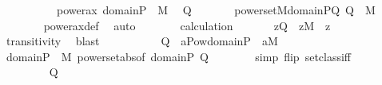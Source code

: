 \begin{isabellebody}
\ \ \isamarkupfalse%
\ {\isacharminus}{\kern0pt}\isanewline
\ \ \ \ \isamarkupfalse%
\ power{\isacharunderscore}{\kern0pt}ax\ {\isacartoucheopen}domain{\isacharparenleft}{\kern0pt}{\isasymtau}{\isacharparenright}{\kern0pt}{\isasymtimes}P\ {\isasymin}\ M{\isacartoucheclose}\ \isamarkupfalse%
\ Q\ \isanewline
\ \ \ \ \ \ {\isachardoublequoteopen}powerset{\isacharparenleft}{\kern0pt}{\isacharhash}{\kern0pt}{\isacharhash}{\kern0pt}M{\isacharcomma}{\kern0pt}domain{\isacharparenleft}{\kern0pt}{\isasymtau}{\isacharparenright}{\kern0pt}{\isasymtimes}P{\isacharcomma}{\kern0pt}Q{\isacharparenright}{\kern0pt}{\isachardoublequoteclose}\ {\isachardoublequoteopen}Q\ {\isasymin}\ M{\isachardoublequoteclose}\isanewline
\ \ \ \ \ \ \isamarkupfalse%
\ power{\isacharunderscore}{\kern0pt}ax{\isacharunderscore}{\kern0pt}def\ \isamarkupfalse%
\ auto\isanewline
\ \ \ \ \isamarkupfalse%
\ \isamarkupfalse%
\ calculation\ \isanewline
\ \ \ \ \isamarkupfalse%
\ {\isachardoublequoteopen}z{\isasymin}Q\ {\isasymLongrightarrow}\ z{\isasymin}M{\isachardoublequoteclose}\ \ z\isanewline
\ \ \ \ \ \ \isamarkupfalse%
\ transitivity\ \isamarkupfalse%
\ blast\isanewline
\ \ \ \ \isamarkupfalse%
\isanewline
\ \ \ \ \isamarkupfalse%
\ {\isachardoublequoteopen}Q\ {\isacharequal}{\kern0pt}\ {\isacharbraceleft}{\kern0pt}a{\isasymin}Pow{\isacharparenleft}{\kern0pt}domain{\isacharparenleft}{\kern0pt}{\isasymtau}{\isacharparenright}{\kern0pt}{\isasymtimes}P{\isacharparenright}{\kern0pt}\ {\isachardot}{\kern0pt}\ a{\isasymin}M{\isacharbraceright}{\kern0pt}{\isachardoublequoteclose}\isanewline
\ \ \ \ \ \ \isamarkupfalse%
\ {\isacartoucheopen}domain{\isacharparenleft}{\kern0pt}{\isasymtau}{\isacharparenright}{\kern0pt}{\isasymtimes}P\ {\isasymin}\ M{\isacartoucheclose}\ powerset{\isacharunderscore}{\kern0pt}abs{\isacharbrackleft}{\kern0pt}of\ {\isachardoublequoteopen}domain{\isacharparenleft}{\kern0pt}{\isasymtau}{\isacharparenright}{\kern0pt}{\isasymtimes}P{\isachardoublequoteclose}\ Q{\isacharbrackright}{\kern0pt}\isanewline
\ \ \ \ \ \ \isamarkupfalse%
\ {\isacharparenleft}{\kern0pt}simp\ flip{\isacharcolon}{\kern0pt}\ setclass{\isacharunderscore}{\kern0pt}iff{\isacharparenright}{\kern0pt}\isanewline
\ \ \ \ \isamarkupfalse%
\ \isanewline
\ \ \ \ \isamarkupfalse%
\ {\isachardoublequoteopen}\ {\isachardot}{\kern0pt}{\isachardot}{\kern0pt}{\isachardot}{\kern0pt}\ {\isacharequal}{\kern0pt}\ {\isacharquery}{\kern0pt}Q{\isachardoublequoteclose}\isanewline

\end{isabellebody}
